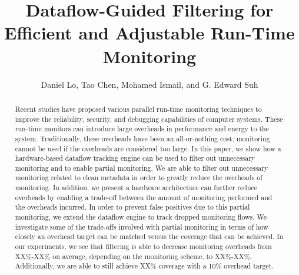 \title{
Dataflow-Guided Filtering for Efficient and Adjustable Run-Time Monitoring
}

{\author{Daniel Lo, Tao Chen, Mohamed Ismail, and G. Edward Suh}}

\date{}
\maketitle

\thispagestyle{empty}

\begin{abstract}

Recent studies have proposed various parallel run-time monitoring techniques to
improve the reliability, security, and debugging capabilities of computer
systems. These run-time monitors can introduce large overheads in performance
and energy to the system.  Traditionally, these overheads have been an
all-or-nothing cost; monitoring cannot be used if the overheads are considered
too large.  In this paper, we show how a hardware-based dataflow tracking
engine can be used to filter out unnecessary monitoring and to enable partial
monitoring.  We are able to filter out unnecessary monitoring related to clean
metadata in order to greatly reduce the overheads of monitoring. In addition,
we present a hardware architecture can further reduce overheads by enabling a
trade-off between the amount of monitoring performed and the overheads
incurred. In order to prevent false positives due to this partial monitoring,
we extend the dataflow engine to track dropped monitoring flows. We investigate
some of the trade-offs involved with partial monitoring in terms of how closely
an overhead target can be matched versus the coverage that can be achieved.
In our experiments, we see that filtering is able to decrease monitoring
overheads from XX\%-XX\% on average, depending on the monitoring scheme, to
XX\%-XX\%. Additionally, we are able to still achieve XX\% coverage with a 10\%
overhead target.

\end{abstract}
